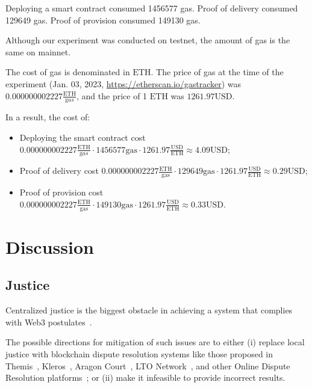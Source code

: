 Deploying a smart contract consumed 1456577 gas.
Proof of delivery consumed 129649 gas.
Proof of provision consumed 149130 gas.

Although our experiment was conducted on testnet, the amount of gas is the same on mainnet.

The cost of gas is denominated in $\mathrm{ETH}$. The price of gas at the time of the experiment (Jan. 03, 2023, \url{https://etherscan.io/gastracker}) was $0.000000002227 \frac{\mathrm{ETH}}{\mathrm gas}$, and the price of 1 $\mathrm{ETH}$ was $1261.97 \mathrm{USD}$.

In a result, the cost of:
\begin{itemize}
  \item Deploying the smart contract cost $0.000000002227 \frac{\mathrm{ETH}}{\mathrm gas} \cdot 1456577 \mathrm{gas} \cdot 1261.97 \frac{\mathrm{USD}}{\mathrm{ETH}} \approx 4.09 \mathrm{USD}$; 
  \item Proof of delivery cost $0.000000002227 \mathrm{\frac{ETH}{gas}} \cdot 129649 \mathrm{gas} \cdot 1261.97 \frac{\mathrm{USD}}{\mathrm{ETH}} \approx 0.29 \mathrm{USD}$; 
  \item Proof of provision cost $0.000000002227 \mathrm{\frac{ETH}{gas}} \cdot 149130 \mathrm{gas} \cdot 1261.97 \frac{\mathrm{USD}}{\mathrm{ETH}} \approx 0.33 \mathrm{USD}$.
\end{itemize}


\section{Discussion}
\label{sec:discussion}

\subsection{Justice}\label{sec:decentralised-justice}

Centralized justice is the biggest obstacle in achieving a system that complies with Web3 postulates~\cite{ethereumWhatWeb3Why}.

The possible directions for mitigation of such issues are to either (i) replace local justice with blockchain dispute resolution systems like those proposed in Themis~\cite{mengThemisDecentralizedEscrow2019}, Kleros~\cite{bergollaKlerosSociolegalCase2022,gudkovCrowdArbitrationBlockchain2020}, Aragon Court~\cite{aragonDecentralizedDisputeResolution}, LTO Network~\cite{ltonetworkNextGenBlockchainB2B}, and other Online Dispute Resolution platforms~\cite{allenGovernanceBlockchainDispute2019}; or (ii) make it infeasible to provide incorrect results.

